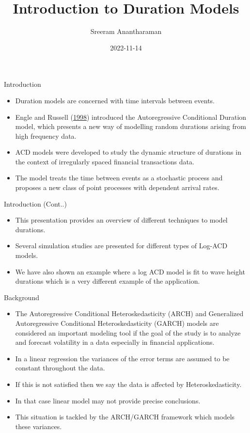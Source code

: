 \documentclass[
  ignorenonframetext,
]{beamer}
\title{Introduction to Duration Models}
\author{Sreeram Anantharaman}
\date{2022-11-14}
\begin{document}
\frame{\titlepage}

\begin{frame}{Introduction}
\protect\hypertarget{introduction}{}
\begin{itemize}
\item
  Duration models are concerned with time intervals between events.
\item
  Engle and Russell (\protect\hyperlink{ref-ACD}{1998}) introduced the
  Autoregressive Conditional Duration model, which presents a new way of
  modelling random durations arising from high frequency data.
\item
  ACD models were developed to study the dynamic structure of durations
  in the context of irregularly spaced financial transactions data.
\item
  The model treats the time between events as a stochastic process and
  proposes a new class of point processes with dependent arrival rates.
\end{itemize}
\end{frame}

\begin{frame}{Introduction (Cont..)}
\protect\hypertarget{introduction-cont..}{}
\begin{itemize}
\item
  This presentation provides an overview of different techniques to
  model durations.
\item
  Several simulation studies are presented for different types of
  Log-ACD models.
\item
  We have also shown an example where a log ACD model is fit to wave
  height durations which is a very different example of the application.
\end{itemize}
\end{frame}

\begin{frame}{Background}
\protect\hypertarget{background}{}
\begin{itemize}
\item
  The Autoregressive Conditional Heteroskedasticity (ARCH) and
  Generalized Autoregressive Conditional Heteroskedasticity (GARCH)
  models are considered an important modeling tool if the goal of the
  study is to analyze and forecast volatility in a data especially in
  financial applications.
\item
  In a linear regression the variances of the error terms are assumed to
  be constant throughout the data.
\item
  If this is not satisfied then we say the data is affected by
  Heteroskedasticity.
\item
  In that case linear model may not provide precise conclusions.
\item
  This situation is tackled by the ARCH/GARCH framework which models
  these variances.
\end{itemize}
\end{frame}
\end{document}
